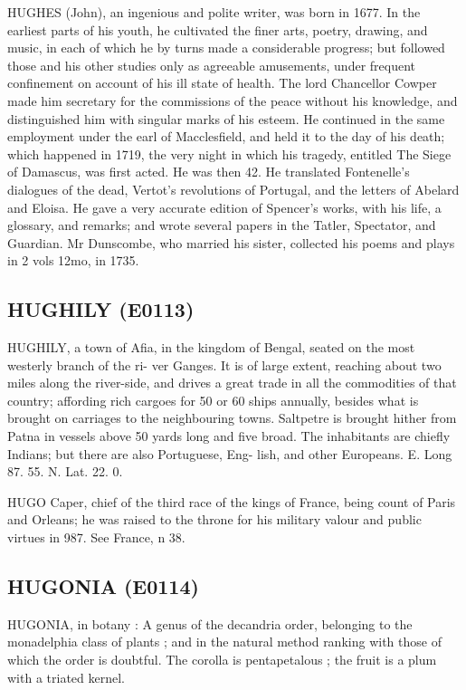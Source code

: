 \documentclass{article}
\begin{document}
HUGHES (John), an ingenious and polite writer, was born in 1677. In the earliest parts of his youth, he cultivated the finer arts, poetry, drawing, and music, in each of which he by turns made a considerable progress; but followed those and his other studies only as agreeable amusements, under frequent confinement on account of his ill state of health. The lord Chancellor Cowper made him secretary for the commissions of the peace without his knowledge, and distinguished him with singular marks of his esteem. He continued in the same employment under the earl of Macclesfield, and held it to the day of his death; which happened in 1719, the very night in which his tragedy, entitled The Siege of Damascus, was first acted. He was then 42. He translated Fontenelle's dialogues of the dead, Vertot's revolutions of Portugal, and the letters of Abelard and Eloisa. He gave a very accurate edition of Spencer's works, with his life, a glossary, and remarks; and wrote several papers in the Tatler, Spectator, and Guardian. Mr Dunscombe, who married his sister, collected his poems and plays in 2 vols 12mo, in 1735.

\subsection*{HUGHILY (E0113)}
HUGHILY, a town of Afia, in the kingdom of
Bengal, seated on the most westerly branch of the ri-
ver Ganges. It is of large extent, reaching about
two miles along the river-side, and drives a great trade
in all the commodities of that country; affording rich
cargoes for 50 or 60 ships annually, besides what is
brought on carriages to the neighbouring towns.
Saltpetre is brought hither from Patna in vessels above
50 yards long and five broad. The inhabitants are
chiefly Indians; but there are also Portuguese, Eng-
lish, and other Europeans. E. Long 87. 55. N.
Lat. 22. 0.

HUGO Caper, chief of the third race of the kings
of France, being count of Paris and Orleans; he was
raised to the throne for his military valour and public
virtues in 987. See France, n 38.

\subsection*{HUGONIA (E0114)}
HUGONIA, in botany : A genus of the decandria
order, belonging to the monadelphia class of plants ;
and in the natural method ranking with those of which
the order is doubtful. The corolla is pentapetalous ;
the fruit is a plum with a triated kernel.
\end{document}
